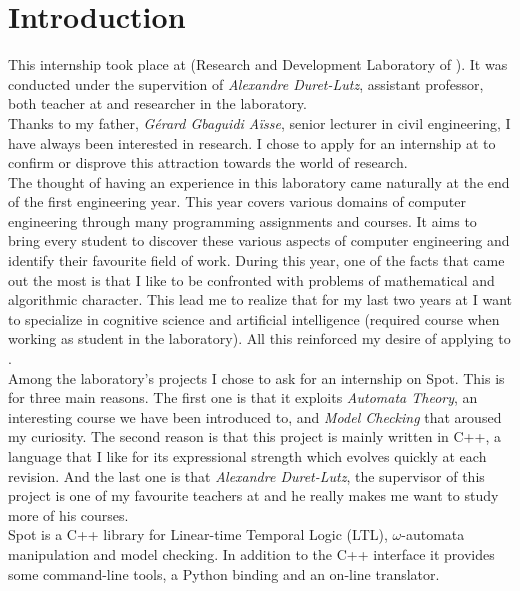 \chapter{Introduction}

This internship took place at \LRDE\space (Research and Development Laboratory of \EPITA). It was conducted
under the supervition of \textit{Alexandre Duret-Lutz}, assistant professor, both teacher at \EPITA\space
and researcher in the laboratory.\\

Thanks to my father, \textit{Gérard Gbaguidi Aïsse}, senior lecturer in civil engineering, I have always
been interested in research. I chose to apply for an internship at \LRDE\space to confirm or disprove this
attraction towards the world of research.\\

The thought of having an experience in this laboratory came naturally at the end of the first
engineering year. This year covers various domains of computer engineering through many programming
assignments and courses. It aims to bring every student to
discover these various aspects of computer engineering and identify their favourite field of work. During
this year, one of the facts that came out the most is that I like to be confronted with problems of
mathematical and algorithmic character. This lead me to realize that for my last two years at \EPITA\space
I want to specialize in cognitive science and artificial intelligence (required course when working as
student in the laboratory). All this reinforced my desire of applying to \LRDE.\\

Among the laboratory's projects I chose to ask for an internship on Spot. This is for three
main reasons. The first one is that it exploits \textit{Automata Theory}, an interesting course we
have been introduced to, and \textit{Model Checking} that aroused my curiosity. The
second reason is that this project is mainly written in C++, a language that I like for its
expressional strength which evolves quickly at each revision. And the last one is that
\textit{Alexandre Duret-Lutz}, the supervisor of this project is one of my favourite teachers  at \EPITA\space
and he really makes me want to study more of his courses.\\

Spot is a C++ library for Linear-time Temporal Logic (LTL), $\omega$-automata manipulation and model
checking. In addition to the C++ interface it provides some command-line tools, a Python binding and an
on-line translator.\\

